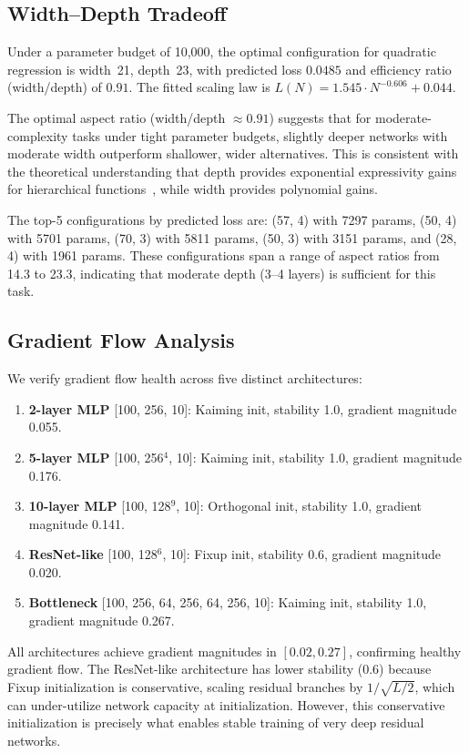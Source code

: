 \documentclass[10pt]{article}
\theoremstyle{definition}
\begin{document}
\subsection{Width--Depth Tradeoff}

Under a parameter budget of 10{,}000, the optimal configuration for quadratic regression is width~21, depth~23, with predicted loss $0.0485$ and efficiency ratio (width/depth) of $0.91$.
The fitted scaling law is $L(N) = 1.545 \cdot N^{-0.606} + 0.044$.

The optimal aspect ratio (width/depth $\approx 0.91$) suggests that for moderate-complexity tasks under tight parameter budgets, slightly deeper networks with moderate width outperform shallower, wider alternatives.
This is consistent with the theoretical understanding that depth provides exponential expressivity gains for hierarchical functions~\citep{poole2016exponential}, while width provides polynomial gains.

The top-5 configurations by predicted loss are: (57, 4) with 7297 params, (50, 4) with 5701 params, (70, 3) with 5811 params, (50, 3) with 3151 params, and (28, 4) with 1961 params.
These configurations span a range of aspect ratios from 14.3 to 23.3, indicating that moderate depth (3--4 layers) is sufficient for this task.

\subsection{Gradient Flow Analysis}

We verify gradient flow health across five distinct architectures:
\begin{enumerate}[nosep]
  \item \textbf{2-layer MLP} [100, 256, 10]: Kaiming init, stability 1.0, gradient magnitude 0.055.
  \item \textbf{5-layer MLP} [100, 256$^4$, 10]: Kaiming init, stability 1.0, gradient magnitude 0.176.
  \item \textbf{10-layer MLP} [100, 128$^9$, 10]: Orthogonal init, stability 1.0, gradient magnitude 0.141.
  \item \textbf{ResNet-like} [100, 128$^6$, 10]: Fixup init, stability 0.6, gradient magnitude 0.020.
  \item \textbf{Bottleneck} [100, 256, 64, 256, 64, 256, 10]: Kaiming init, stability 1.0, gradient magnitude 0.267.
\end{enumerate}

All architectures achieve gradient magnitudes in $[0.02, 0.27]$, confirming healthy gradient flow.
The ResNet-like architecture has lower stability (0.6) because Fixup initialization is conservative, scaling residual branches by $1/\sqrt{L/2}$, which can under-utilize network capacity at initialization.
However, this conservative initialization is precisely what enables stable training of very deep residual networks.
\end{document}
